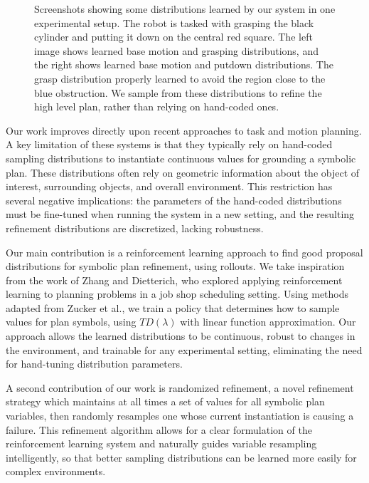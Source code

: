 \begin{figure}[h]
  \caption{Screenshots showing some distributions learned by our system in one experimental
    setup. The robot is tasked with grasping the black cylinder and putting it down on the
    central red square. The left image shows learned base motion and grasping distributions,
    and the right shows learned base motion and putdown distributions. The grasp distribution
    properly learned to avoid the region close to the blue obstruction. We sample from these distributions
    to refine the high level plan, rather than relying on hand-coded ones.}
  \label{fig:cover}
\end{figure}

Our work improves directly upon recent approaches to task and motion planning.
A key limitation of these systems is that they typically rely on hand-coded
sampling distributions to instantiate continuous values for grounding a symbolic plan.
These distributions often rely on
geometric information about the object of interest, surrounding objects, and overall
environment. This restriction has several negative implications: the parameters of the
hand-coded distributions must be fine-tuned when running the system in a new setting, and the
resulting refinement distributions are discretized, lacking robustness.

Our main contribution is a reinforcement learning approach to find good proposal
distributions for symbolic plan refinement, using rollouts. We take inspiration
from the work of Zhang and Dietterich, who explored applying reinforcement learning
to planning problems in a job shop scheduling setting. Using methods adapted from
Zucker et al., we train a policy that
determines how to sample values for plan symbols, using $TD(\lambda)$ with linear function
approximation. Our approach allows
the learned distributions to be continuous, robust to changes in the environment, and
trainable for any experimental setting, eliminating the need for hand-tuning distribution parameters.

A second contribution of our work is randomized refinement, a novel refinement strategy
which maintains at all times a set of values for all symbolic plan variables, then randomly
resamples one whose current instantiation is causing a failure.
This refinement algorithm allows for a clear formulation of the reinforcement
learning system and naturally guides variable resampling intelligently, so that better
sampling distributions can be learned more easily for complex environments.

